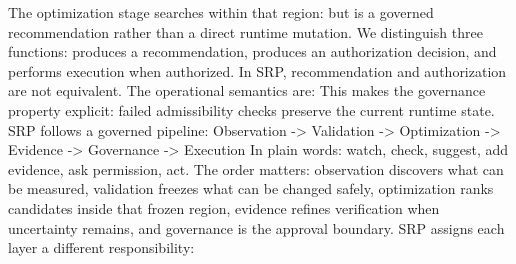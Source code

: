 {}The optimization stage searches within that region:\markdownRendererInterblockSeparator
{}\markdownRendererInterblockSeparator
{}but  is a governed recommendation rather than a direct runtime mutation.\markdownRendererParagraphSeparator
{}We distinguish three functions:\markdownRendererInterblockSeparator
{}\markdownRendererInterblockSeparator
{}produces a recommendation,\markdownRendererInterblockSeparator
{}\markdownRendererInterblockSeparator
{}produces an authorization decision, and\markdownRendererInterblockSeparator
{}\markdownRendererInterblockSeparator
{}performs execution when authorized. In SRP, recommendation and authorization are not equivalent. The operational semantics are:\markdownRendererInterblockSeparator
{}\markdownRendererInterblockSeparator
{}This makes the governance property explicit: failed admissibility checks preserve the current runtime state.\markdownRendererInterblockSeparator
{}
\markdownRendererSectionEnd \markdownRendererSectionBegin
{}\markdownRendererInterblockSeparator
{}SRP follows a governed pipeline:\markdownRendererParagraphSeparator
{}Observation -> Validation -> Optimization -> Evidence -> Governance -> Execution\markdownRendererParagraphSeparator
{}In plain words: watch, check, suggest, add evidence, ask permission, act.\markdownRendererParagraphSeparator
{}The order matters: observation discovers what can be measured, validation freezes what can be changed safely, optimization ranks candidates inside that frozen region, evidence refines verification when uncertainty remains, and governance is the approval boundary.\markdownRendererInterblockSeparator
{}
\markdownRendererSectionEnd \markdownRendererSectionBegin
{}\markdownRendererInterblockSeparator
{}SRP assigns each layer a different responsibility:\markdownRendererInterblockSeparator
{}\markdownRendererInterblockSeparator
